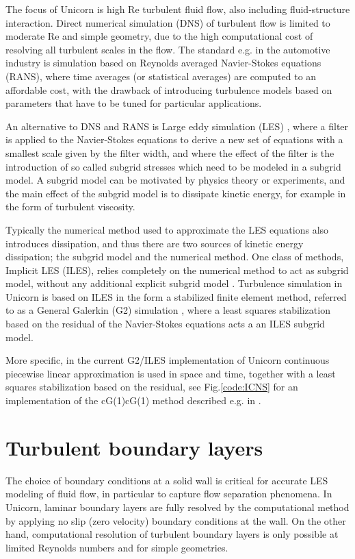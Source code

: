 The focus of Unicorn is high Re turbulent fluid flow, also including fluid-structure interaction. Direct numerical simulation (DNS) of turbulent flow is limited to moderate Re and simple geometry, due to the high computational cost of resolving all turbulent scales in the flow. The standard e.g. in the automotive industry is simulation based on Reynolds averaged Navier-Stokes equations (RANS), where time averages (or statistical averages) are computed to an affordable cost, with the drawback of introducing turbulence models based on parameters that have to be tuned for particular applications.

An alternative to DNS and RANS is Large eddy simulation (LES) \cite{Sagaut2005}, where a filter is applied to the Navier-Stokes equations to derive a new set of equations with a smallest scale given by the filter width, and where the effect of the filter is the introduction of so called subgrid stresses which need to be modeled in a subgrid model. A subgrid model can be motivated by physics theory or experiments, and the main effect of the subgrid model is to dissipate kinetic energy, for example in the form of turbulent viscosity.

Typically the numerical method used to approximate the LES equations also introduces dissipation, and thus there are two sources of kinetic energy dissipation; the subgrid model and the numerical method. One class of methods, Implicit LES (ILES), relies completely on the numerical method to act as subgrid model, without any additional explicit subgrid model \cite{Sagaut2005}. Turbulence simulation in Unicorn is based on ILES in the form a stabilized finite element method, referred to as a General Galerkin (G2) simulation \cite{HoffmanJohnson2007}, where a least squares stabilization based on the residual of the Navier-Stokes equations acts a an ILES subgrid model.

More specific, in the current G2/ILES implementation of Unicorn continuous piecewise linear approximation is used in space and time, together with a least squares stabilization based on the residual, see Fig.\ref{code:ICNS} for an implementation of the cG(1)cG(1) method described e.g. in \cite{HoffmanJohnson2007}.

\section{Turbulent boundary layers}
\label{section:blayer}

The choice of boundary conditions at a solid wall is critical for accurate LES modeling of fluid flow, in particular to capture flow separation phenomena. In Unicorn, laminar boundary layers are fully resolved by the computational method by applying no slip (zero velocity) boundary conditions at the wall. On the other hand, computational resolution of turbulent boundary layers is only possible at limited Reynolds numbers and for simple geometries.


